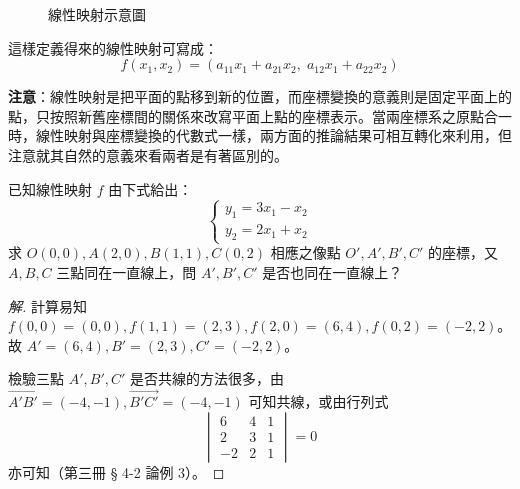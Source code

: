 \begin{figure}[H]
\centering
{}
\caption{線性映射示意圖}
\label{fig:b4s-1-3-2}
\end{figure}

這樣定義得來的線性映射可寫成：
\begin{equation}
f(x_1, x_2) = (a_{11}x_1 + a_{21}x_2, \; a_{12}x_1 + a_{22}x_2) \label{eq:b4s-1-3-5}
\end{equation}

\noindent\textbf{注意}：線性映射是把平面的點移到新的位置，而座標變換的意義則是固定平面上的點，只按照新舊座標間的關係來改寫平面上點的座標表示。當兩座標系之原點合一時，線性映射與座標變換的代數式一樣，兩方面的推論結果可相互轉化來利用，但注意就其自然的意義來看兩者是有著區別的。

\begin{example}[例 4]
已知線性映射 $f$ 由下式給出：
\[ \begin{cases} y_1 = 3x_1 - x_2 \\ y_2 = 2x_1 + x_2 \end{cases} \]
求 $O(0, 0), A(2, 0), B(1, 1), C(0, 2)$ 相應之像點 $O', A', B', C'$ 的座標，又 $A, B, C$ 三點同在一直線上，問 $A', B', C'$ 是否也同在一直線上？
\end{example}

\begin{proof}[解]
計算易知 $f(0, 0) = (0, 0), f(1, 1) = (2, 3), f(2, 0) = (6, 4), f(0, 2) = (-2, 2)$。故 $A' = (6, 4), B' = (2, 3), C' = (-2, 2)$。

檢驗三點 $A', B', C'$ 是否共線的方法很多，由 $\vec{A'B'} = (-4, -1), \vec{B'C'} = (-4, -1)$ 可知共線，或由行列式
\[ \begin{vmatrix} 6 & 4 & 1 \\ 2 & 3 & 1 \\ -2 & 2 & 1 \end{vmatrix} = 0 \]
亦可知（第三冊 § 4-2 論例 3）。
\end{proof}

